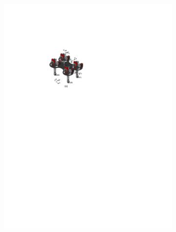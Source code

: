\begin{figure}[htb]
    \centering
    \begin{subfigure}[b]{0.4\textwidth}
    \centering 
    \includegraphics[width=\linewidth]{img/chap3/robot.pdf}
    \end{subfigure}
    \begin{subfigure}[b]{0.59\textwidth}
    \centering 

\end{subfigure}
\end{figure}
